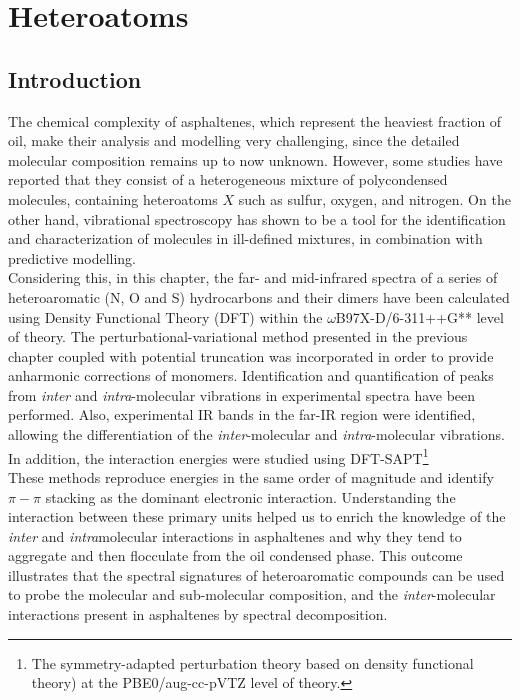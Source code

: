 \chapter[Vibrational spectra calculations]{Heteroatoms}
\minitoc
\restoregeometry

\newpage
	
	
	\section*{Introduction}


The chemical complexity of asphaltenes, which represent the heaviest fraction of oil, make their analysis and modelling very challenging, since the detailed molecular composition remains up to now unknown. However, some studies have reported that they consist of a heterogeneous mixture of polycondensed molecules, containing heteroatoms $X$ such as sulfur, oxygen, and nitrogen. On the other hand, vibrational spectroscopy has shown to be a tool for the identification and characterization of molecules in ill-defined mixtures, in combination with predictive modelling.\\

Considering this, in this chapter, the far- and mid-infrared spectra of a series of heteroaromatic (N, O and S) hydrocarbons and their dimers have been calculated using Density Functional Theory (DFT) within the $\omega$B97X-D/6-311++G** level of theory. The perturbational-variational method presented in the previous chapter coupled with potential truncation was incorporated in order to provide anharmonic corrections of monomers. Identification and quantification of peaks from \textit{inter} and \textit{intra}-molecular vibrations in experimental spectra have been performed. Also, experimental IR bands in the far-IR region were identified, allowing the differentiation of the \textit{inter}-molecular and \textit{intra}-molecular vibrations. In addition, the interaction energies were studied using DFT-SAPT\footnote{The symmetry-adapted perturbation theory based on density functional theory) at the PBE0/aug-cc-pVTZ level of theory.} \\
	
	These methods reproduce energies in the same order of magnitude and identify $\pi-\pi$ stacking as the dominant electronic interaction. Understanding the interaction between these primary units helped us to enrich the knowledge of the \textit{inter} and \textit{intra}molecular interactions in asphaltenes and why they tend to aggregate and then flocculate from the oil condensed phase. This outcome illustrates that the spectral signatures of heteroaromatic compounds can be used to probe the molecular and sub-molecular composition, and the \textit{inter}-molecular interactions present in asphaltenes by spectral decomposition.\\
	
